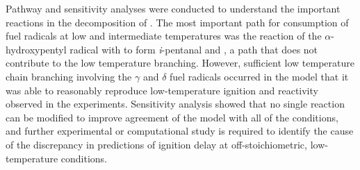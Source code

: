 \documentclass[../main.tex]{subfiles}
\begin{document}
Pathway and sensitivity analyses were conducted to understand
the important reactions in the decomposition of \iPeOH{}.
The most important path for consumption of fuel radicals at low
and intermediate temperatures was the reaction of the
$\alpha$-hydroxypentyl radical with  to form
\textit{i}-pentanal and  , a path that does not contribute to the
low temperature branching. However, sufficient low temperature chain
branching involving the $\gamma$ and $\delta$ fuel radicals occurred
in the model that it was able to reasonably reproduce low-temperature
ignition and reactivity observed in the experiments. Sensitivity
analysis showed that no single reaction can be modified to improve
agreement of the model with all of the conditions, and further
experimental or computational study is required to identify the
cause of the discrepancy in predictions of ignition delay
at off-stoichiometric, low-temperature conditions.
\end{document}
